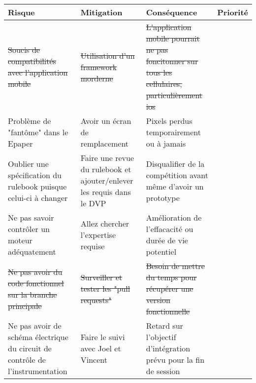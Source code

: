 \begin{tabularx}{\linewidth}{
    |>{\hsize=0.40\hsize}X|%
    >{\hsize=0.25\hsize}X|%
    >{\hsize=0.25\hsize}X|%
    >{\hsize=0.1\hsize}X|%
  }
    \hline
    \textbf{Risque} & \textbf{Mitigation} & \textbf{Conséquence} & \textbf{Priorité}\\\hline
    \st{Soucis de compatibilités avec l'application mobile} & \st{Utilisation d'un framework morderne} & \st{L'application mobile pourrait ne pas foncitonner sur tous les cellulaires, particulièrement ios} & 4 \\\hline %
    Problème de "fantôme" dans le Epaper & Avoir un écran de remplacement & Pixels perdus temporairement ou à jamais & 1 \\\hline %
    Oublier une spécification du rulebook puisque celui-ci à changer & Faire une revue du rulebook et ajouter/enlever les requis dans le DVP & Disqualifier de la compétition avant même d'avoir un prototype & 1\\\hline
    
    Ne pas savoir contrôler un moteur adéquatement & Allez chercher l'expertise requise & Amélioration de l'effacacité ou durée de vie potentiel & 4 \\\hline
    \st{Ne pas avoir du code fonctionnel sur la branche principale} & \st{Surveiller et tester les "pull requests"} & \st{Besoin de mettre du temps pour récupérer une version fonctionnelle} &  2 \\\hline
    Ne pas avoir de schéma électrique du circuit de contrôle de l'instrumentation & Faire le suivi avec Joel et Vincent & Retard sur l'objectif d'intégration prévu pour la fin de session & 2 \\\hline %
  \end{tabularx}
  
  

  
